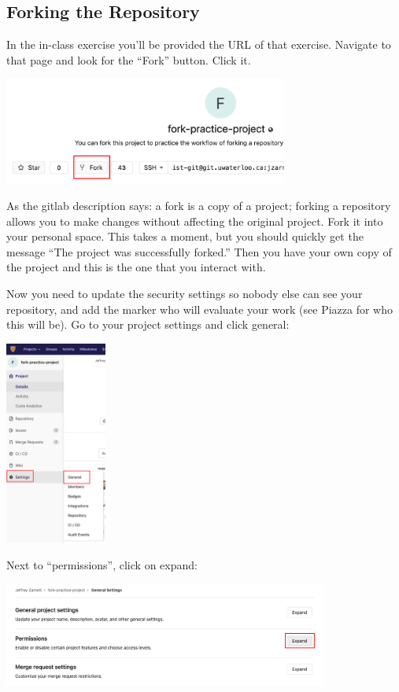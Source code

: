 \subsection*{Forking the Repository}
In the in-class exercise you'll be provided the URL of that exercise. Navigate to that page and look for the ``Fork'' button. Click it.

\begin{center}
	\includegraphics[width=0.7\textwidth]{images/gitlab-fork.png}
\end{center}

As the gitlab description says: a fork is a copy of a project; forking a repository allows you to make changes without affecting the original project. Fork it into your personal space. This takes a moment, but you should quickly get the message ``The project was successfully forked.'' Then you have your own copy of the project and this is the one that you interact with.

Now you need to update the security settings so nobody else can see your repository, and add the marker who will evaluate your work (see Piazza for who this will be). Go to your project settings and click general:

\begin{center}
	\includegraphics[width=0.25\textwidth]{images/gitlab-settings.png}
\end{center}

Next to ``permissions'', click on expand:

\begin{center}
	\includegraphics[width=0.8\textwidth]{images/gitlab-settings2.png}
\end{center}

